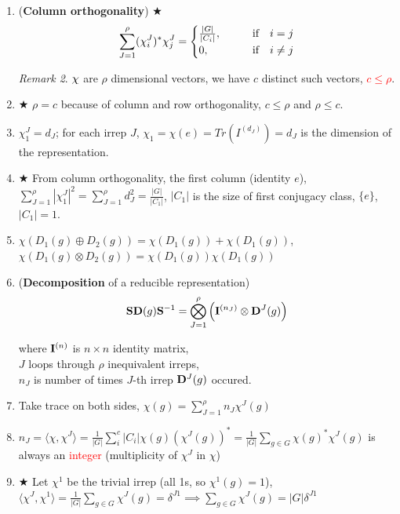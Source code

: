 \documentclass{article}
\theoremstyle{remark}
\newtheorem*{remark}{Remark}
\theoremstyle{remark}
\newcommand{\where}[1]{\begin{flushright}where #1.\end{flushright}}
\newcommand{\mylabel}[2]{\hyperref[#1]{#2}\label{back:#1}}
\newcommand{\myref}[1]{\hyperref[back:#1]{$\bigstar$}\label{#1}}
\begin{document}
\begin{enumerate}
{                $C_i$ is the $i$-th conjugacy class}
            \begin{remark}
                $\vb{\chi}$ are $c$-dimensional vectors, for $\rho$ inequivalent irreps, we have $\rho$ distinct $\chi$. \textcolor{red}{$\rho\leq c$} for linear independence
            \end{remark}
        \item (\textbf{Column orthogonality}) \mylabel{thm:col_orthog}{$\bigstar$}\[
                \sum_{J=1}^\rho(\chi_i^J)^*\chi_j^J=\begin{cases}
                    \frac{|G|}{|C_i|},&\quad \qif i=j\\
                    0,&\quad \qif i\neq j
                \end{cases}
            \]
            \begin{remark}
                $\vb{\chi}$ are $\rho$ dimensional vectors, we have $c$ distinct such vectors, \textcolor{red}{$c\leq\rho$}.
            \end{remark}
        \item \myref{thm:irrep1} $\rho=c$ because of column and row orthogonality, $c\leq\rho$ and $\rho\leq c$.
        \item $\chi_1^J=d_J$; for each irrep $J$, $\chi_1=\chi(e)=Tr(I^{(d_J)})=d_J$ is the dimension of the representation.
        \item \myref{thm:irrep2} From column orthogonality, the first column (identity $e$), $\sum_{J=1}^\rho|\chi_1^J|^2=\sum_{J=1}^\rho d_J^2 = \frac{|G|}{|C_1|}$, $|C_1|$ is the size of first conjugacy class, $\{e\}$, $|C_1|=1$.
        \item $\chi(D_1(g)\oplus D_2(g))=\chi(D_1(g))+\chi(D_1(g))$,\\ $\chi(D_1(g)\otimes D_2(g))=\chi(D_1(g))\chi(D_1(g))$
        \item (\textbf{Decomposition} of a reducible representation) \[\vb{S}\vb{D}(g)\vb{S}^{-1}=\bigotimes_{J=1}^\rho \left(\vb{I}^{(n_J)}\otimes\vb{D}^J(g)\right)\]
                \where{$\vb{I}^{(n)}$ is $n\times n$ identity matrix,\\ $J$ loops through $\rho$ inequivalent irreps,\\ $n_J$ is number of times $J$-th irrep $\vb{D}^J(g)$ occured}
        \item Take trace on both sides, $\chi(g)=\sum_{J=1}^\rho n_J\chi^J(g)$
        \item $\boxed{n_J = \langle\chi,\chi^J\rangle = \frac{1}{|G|}\sum_{i}^c |C_i|\chi(g)(\chi^J(g))^* = \frac{1}{|G|}\sum_{g\in G}\chi(g)^*\chi^J(g)}$ is always an \textcolor{red}{integer} (multiplicity of $\chi^J$ in $\chi$)
        \item \myref{thm:row_sum} Let $\chi^1$ be the trivial irrep (all 1s, so $\chi^1(g)=1$), $\langle\chi^J,\chi^1\rangle=\frac{1}{|G|}\sum_{g\in G}\chi^J(g)=\delta^{J1} \implies \sum_{g\in G}\chi^J(g) = |G|\delta^{J1}$
    \end{enumerate}
\end{document}
